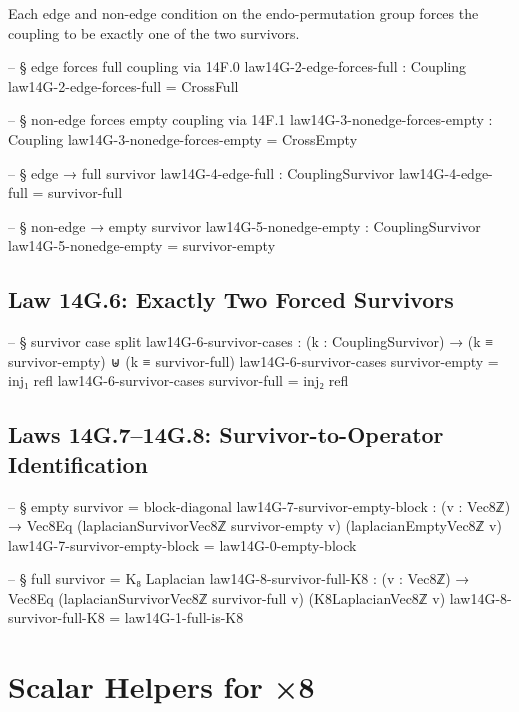 \documentclass[11pt,a4paper]{book}
\begin{document}
Each edge and non-edge condition on the endo-permutation group forces the
coupling to be exactly one of the two survivors.

\begin{code}
-- § edge forces full coupling via 14F.0
law14G-2-edge-forces-full : Coupling
law14G-2-edge-forces-full = CrossFull

-- § non-edge forces empty coupling via 14F.1
law14G-3-nonedge-forces-empty : Coupling
law14G-3-nonedge-forces-empty = CrossEmpty

-- § edge → full survivor
law14G-4-edge-full : CouplingSurvivor
law14G-4-edge-full = survivor-full

-- § non-edge → empty survivor
law14G-5-nonedge-empty : CouplingSurvivor
law14G-5-nonedge-empty = survivor-empty
\end{code}

\subsection{Law 14G.6: Exactly Two Forced Survivors}

\begin{code}
-- § survivor case split
law14G-6-survivor-cases : (k : CouplingSurvivor) → (k ≡ survivor-empty) ⊎ (k ≡ survivor-full)
law14G-6-survivor-cases survivor-empty = inj₁ refl
law14G-6-survivor-cases survivor-full  = inj₂ refl
\end{code}

\subsection{Laws 14G.7--14G.8: Survivor-to-Operator Identification}

\begin{code}
-- § empty survivor = block-diagonal
law14G-7-survivor-empty-block : (v : Vec8ℤ) → Vec8Eq (laplacianSurvivorVec8ℤ survivor-empty v) (laplacianEmptyVec8ℤ v)
law14G-7-survivor-empty-block = law14G-0-empty-block

-- § full survivor = K₈ Laplacian
law14G-8-survivor-full-K8 : (v : Vec8ℤ) → Vec8Eq (laplacianSurvivorVec8ℤ survivor-full v) (K8LaplacianVec8ℤ v)
law14G-8-survivor-full-K8 = law14G-1-full-is-K8
\end{code}

\section{Scalar Helpers for ×8}
\end{document}
